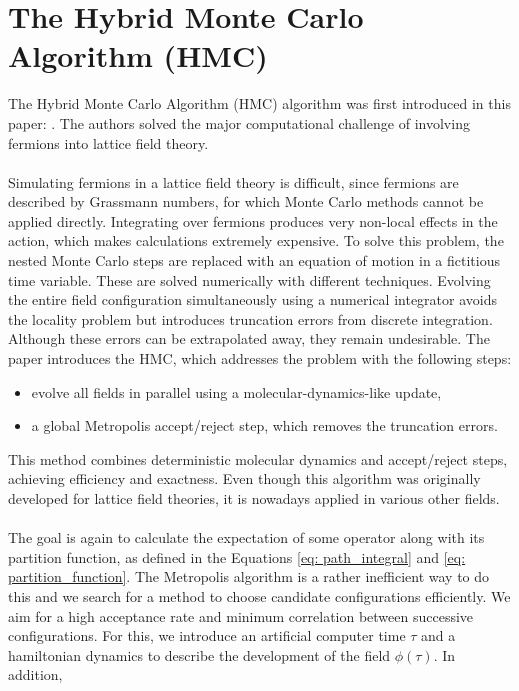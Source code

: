 \section{The Hybrid Monte Carlo Algorithm (HMC)}\label{sec: HMC}
The Hybrid Monte Carlo Algorithm (HMC) algorithm was first introduced in this paper: \cite{Duane1987HMC}. The authors solved the major
computational challenge of involving fermions into lattice field theory. \\\\
Simulating fermions in a lattice field theory is difficult, since fermions are described by Grassmann numbers, for which Monte Carlo methods
cannot be applied directly. Integrating over fermions produces very non-local effects in the action, which makes calculations extremely 
expensive. To solve this problem, the nested Monte Carlo steps are replaced with an equation of motion in a fictitious time variable. These are solved 
numerically with different techniques. Evolving the entire field configuration simultaneously using a numerical integrator avoids the locality problem 
but introduces truncation errors from discrete integration. Although these errors can be extrapolated away, they remain undesirable. 
The paper \cite{Duane1987HMC} introduces the HMC, which addresses the problem with the following steps: 
\begin{itemize}
    \item evolve all fields in parallel using a molecular-dynamics-like update, 
    \item a global Metropolis accept/reject step, which removes the truncation errors. 
\end{itemize}
This method combines deterministic molecular dynamics and accept/reject steps, achieving efficiency and exactness. Even though this algorithm 
was originally developed for lattice field theories, it is nowadays applied in various other fields. 
\\\\
The goal is again to calculate the expectation of some operator along with its partition function, as defined in the Equations 
\ref{eq: path_integral} and \ref{eq: partition_function}. The Metropolis algorithm is a rather inefficient way to do this and we search for 
a method to choose candidate configurations efficiently. We aim for a high acceptance rate and minimum correlation between successive configurations. 
For this, we introduce an artificial computer time $\tau$ and a hamiltonian dynamics to describe the development of the field $\phi(\tau)$. In addition, 

